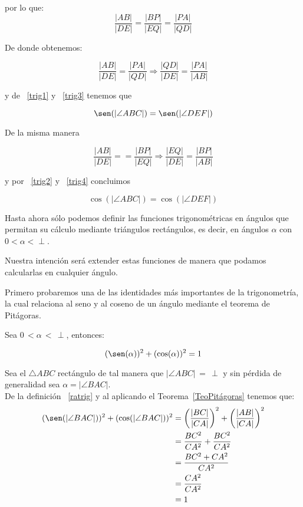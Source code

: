 \begin{prop}
\begin{pba}
por lo que:
\[ \frac{|AB|}{|DE|} = \frac{|BP|}{|EQ|} = \frac{|PA|}{|QD|} \]

De donde obtenemos:

 \[ \frac{|AB|}{|DE|} = \frac{|PA|}{|QD|} \Rightarrow \frac{|QD|}{|DE|} = \frac{|PA|}{|AB|}\]

y de ~\ref{trig1} y ~\ref{trig3} tenemos que

 \[ \sen( |\angle ABC|) = \sen( |\angle DEF|)\]
 
De la misma manera 
 
 \[ \frac{|AB|}{|DE|} = = \frac{|BP|}{|EQ|} \Rightarrow \frac{|EQ|}{|DE|} = \frac{|BP|}{|AB|}\]
 
 y por ~\ref{trig2} y ~\ref{trig4} concluimos

\[ \cos( |\angle ABC|) = \cos( |\angle DEF|)\]
 
\end{pba}
\end{prop}
         
Hasta ahora sólo podemos definir las funciones trigonométricas en ángulos que permitan su cálculo mediante triángulos rectángulos, es decir, en ángulos $\alpha$ con $0 < \alpha < \perp$.

Nuestra intención será extender estas funciones de manera que podamos calcularlas en cualquier ángulo. 

Primero probaremos  una de las identidades más importantes de la trigonometría, la cual relaciona al seno y al coseno de un ángulo mediante el teorema de Pitágoras. 

\begin{prop} \label{idpit}
Sea $0\, < \alpha \, < \, \perp$, entonces:
         
\[ (\sen(\alpha))^2 + (\cos(\alpha))^2 = 1 \]
            
\begin{pba} 
Sea el $\triangle ABC$ rectángulo de tal manera que $|\angle ABC|\,=\,\perp$ y 
sin pérdida de generalidad sea $\alpha = |\angle BAC|$.\\
De la definición ~\ref{ratrig} y al aplicando el Teorema~\ref{TeoPitágoras} tenemos que:
\begin{align*}
(\sen(|\angle BAC|))^2 + (\cos(|\angle BAC|))^2 & = \left( \frac{|BC|}{|CA|} \right)^2 + \left( \frac{|AB|}{|CA|}\right)^2\\
&= \frac{BC^2}{CA^2} + \frac{BC^2}{CA^2}\\
&= \frac{BC^2 + CA^2}{CA^2}\\
&= \frac{CA^2}{CA^2}\\
&= 1
\end{align*}
\end{pba}          
\end{prop}    

